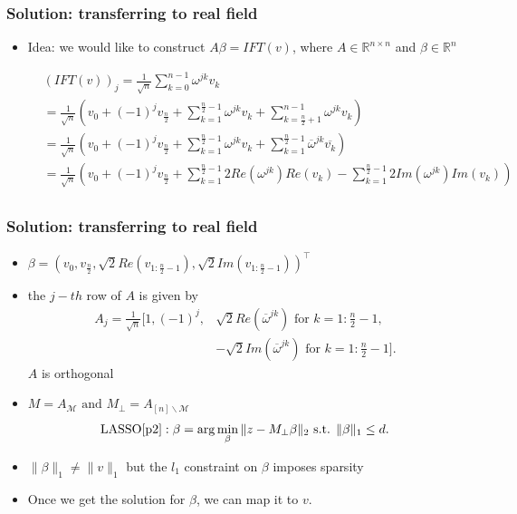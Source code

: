 \documentclass{beamer}
\begin{document}
\begin{frame}
\frametitle{Solution: transferring to real field}
\begin{itemize}
\item Idea: we would like to construct $A\beta = IFT(v)$, where $A\in\mathbb{R}^{n\times n}$ and $\beta\in\mathbb{R}^n$

\begin{equation}
    \begin{aligned}
        &\left(IFT(v)\right)_j = \frac{1}{\sqrt{n}}\sum_{k=0}^{n-1}\omega^{jk}v_k \\&=\frac{1}{\sqrt{n}}\left(v_0 + (-1)^j v_{\frac{n}{2}} +\sum_{k=1}^{\frac{n}{2}-1}\omega^{jk}v_k + \sum_{k=\frac{n}{2}+1}^{n-1}\omega^{jk}v_k\right)\\
    & = \frac{1}{\sqrt{n}}\left(v_0 + (-1)^j v_{\frac{n}{2}} +\sum_{k=1}^{\frac{n}{2}-1}\omega^{jk}v_k + \sum_{k=1}^{\frac{n}{2}-1}\overline{\omega}^{jk}\overline{v_k}\right)\\
    &=\frac{1}{\sqrt{n}}\left(v_0 + (-1)^j v_{\frac{n}{2}} +\sum_{k=1}^{\frac{n}{2}-1}2Re(\omega^{jk})Re(v_k) -\sum_{k=1}^{\frac{n}{2}-1} 2Im(\omega^{jk})Im(v_k)\right)\\
    \end{aligned}
\end{equation}
\end{itemize}
\end{frame}

\begin{frame}
\frametitle{Solution: transferring to real field}
\begin{itemize}
\item $\beta = (v_0, v_{\frac{n}{2}}, \sqrt{2}Re(v_{1:\frac{n}{2}-1}), \sqrt{2}Im(v_{1:\frac{n}{2}-1}))^{\top}$
\item the $j-th$ row of $A$ is given by
\begin{equation}\label{A}
\begin{aligned}
    A_j = \frac{1}{\sqrt{n}}[1, (-1)^j, &\sqrt{2}Re\left(\overline{\omega}^{jk}\right) \text{ for }k = 1:\frac{n}{2}-1, \\
    &-\sqrt{2}Im\left(\overline{\omega}^{jk}\right) \text{ for }k = 1:\frac{n}{2}-1].
\end{aligned}
\end{equation}
$A$ is orthogonal
\item $M = A_{\mathcal{M}}\text{ and }M_{\perp} = A_{[n]\backslash\mathcal{M}}$
\begin{equation}\label{realopt}
   \text{LASSO}\cite{p2}: \beta = \arg\min_{\beta}\|z-M_{\perp}\beta\|_2\text{ s.t. }\|\beta\|_1\leq d.
\end{equation}
\item $\|\beta\|_1\neq\|v\|_1$ but the $l_1$ constraint on $\beta$ imposes sparsity
\item Once we get the solution for $\beta$, we can map it to $v$.
\end{itemize}
\end{frame}
\end{document}
